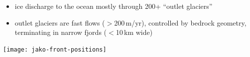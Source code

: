 \documentclass[hide notes,intlimits]{beamer}
\begin{document}
\begin{frame}[plain]
    \begin{itemize}
    \item ice discharge to the ocean mostly through 200+ ``outlet glaciers''
    \item outlet glaciers are fast flows ($>$200\,m/yr), controlled by bedrock geometry, terminating in narrow fjords ($<$10\,km wide)
    \end{itemize}
    \begin{center}
      \texttt{[image: jako-front-positions]}
    \end{center}
\end{frame}

 
\end{document}
